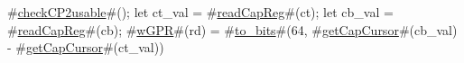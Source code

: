 #\hyperref[sailMIPSzcheckCP2usable]{checkCP2usable}#();
let ct_val = #\hyperref[sailMIPSzreadCapReg]{readCapReg}#(ct);
let cb_val = #\hyperref[sailMIPSzreadCapReg]{readCapReg}#(cb);
#\hyperref[sailMIPSzwGPR]{wGPR}#(rd) = #\hyperref[sailMIPSztozybits]{to\_bits}#(64, #\hyperref[sailMIPSzgetCapCursor]{getCapCursor}#(cb_val) - #\hyperref[sailMIPSzgetCapCursor]{getCapCursor}#(ct_val))

